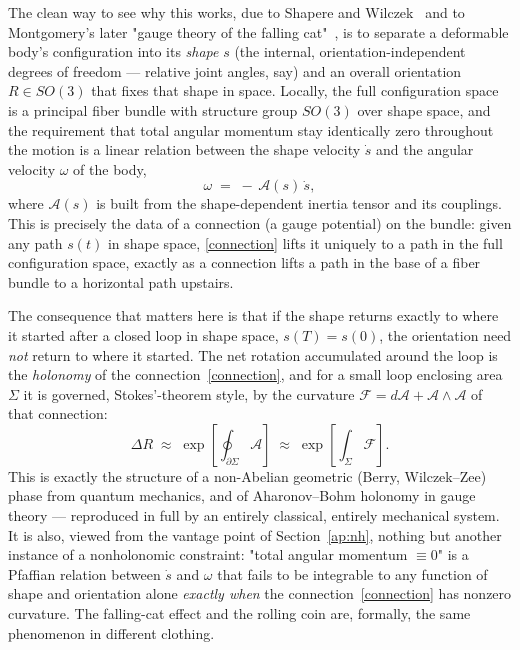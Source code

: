 The clean way to see why this works, due to Shapere and
Wilczek~\cite{shapere+wilczek} and to Montgomery's later "gauge
theory of the falling cat"~\cite{montgomery}, is to separate a
deformable body's configuration into its \emph{shape} $s$ (the
internal, orientation-independent degrees of freedom --- relative
joint angles, say) and an overall orientation $R\in SO(3)$ that fixes
that shape in space. Locally, the full configuration space is a
principal fiber bundle with structure group $SO(3)$ over shape space,
and the requirement that total angular momentum stay identically
zero throughout the motion is a linear relation between the shape
velocity $\dot s$ and the angular velocity $\omega$ of the body,
\begin{equation}
  \omega \;=\; -\,\mathcal A(s)\,\dot s ,
  \label{connection}
\end{equation}
where $\mathcal A(s)$ is built from the shape-dependent inertia
tensor and its couplings. This is precisely the data of a connection
(a gauge potential) on the bundle: given any path $s(t)$ in shape
space, \eqref{connection} lifts it uniquely to a path in the full
configuration space, exactly as a connection lifts a path in the
base of a fiber bundle to a horizontal path upstairs.

The consequence that matters here is that if the shape returns
exactly to where it started after a closed loop in shape space,
$s(T) = s(0)$, the orientation need \emph{not} return to where it
started. The net rotation accumulated around the loop is the
\emph{holonomy} of the connection~\eqref{connection}, and for a
small loop enclosing area $\Sigma$ it is governed, Stokes'-theorem
style, by the curvature $\mathcal F = d\mathcal A + \mathcal
A\wedge\mathcal A$ of that connection:
\begin{equation}
  \Delta R \;\approx\; \exp\!\left[\oint_{\partial\Sigma}\mathcal
  A\right] \;\approx\; \exp\!\left[\int_{\Sigma}\mathcal F\right].
  \label{holonomy}
\end{equation}
This is exactly the structure of a non-Abelian geometric (Berry,
Wilczek--Zee) phase from quantum mechanics, and of Aharonov--Bohm
holonomy in gauge theory --- reproduced in full by an entirely
classical, entirely mechanical system. It is also, viewed from the
vantage point of Section~\ref{ap:nh}, nothing but another
instance of a nonholonomic constraint: "total angular momentum
$\equiv 0$" is a Pfaffian relation between $\dot s$ and $\omega$ that
fails to be integrable to any function of shape and orientation
alone \emph{exactly when} the connection~\eqref{connection} has
nonzero curvature. The falling-cat effect and the rolling coin are,
formally, the same phenomenon in different clothing.

